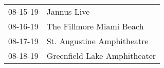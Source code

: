 \begin{supertabular}{p{0.07\textwidth}p{0.23\textwidth}}
 08-15-19 &                   Jannus Live \\
 08-16-19 &      The Fillmore Miami Beach \\
 08-17-19 &    St. Augustine Amphitheatre \\
 08-18-19 &  Greenfield Lake Amphitheater \\
\end{supertabular}
